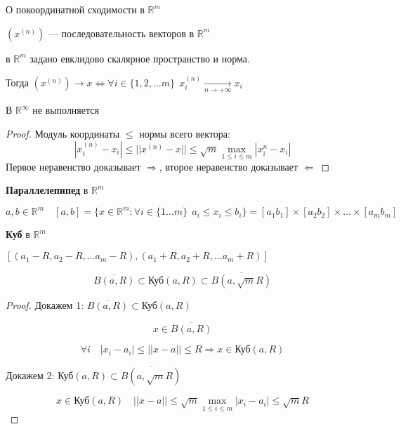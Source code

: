 \begin{lemma}
    О покоординатной сходимости в $\mathbb{R}^m$

    $(x^{(n)})$ --- последовательность векторов в $\mathbb{R}^m$
    
    в $\mathbb{R}^m$ задано евклидово скалярное пространство и норма.

    Тогда $(x^{(n)})\to x \Leftrightarrow \forall i\in\{1,2,\ldots m\} \ \ x_i^{(n)}\underset{n\to+\infty}\to x_i$
\end{lemma}

\begin{remark}
    В $\mathbb{R}^{\infty}$ не выполняется
\end{remark}

\begin{proof}
    Модуль координаты $\leq$ нормы всего вектора:
    $$|x_i^{(n)}-x_i|\leq ||x^{(n)}-x||\leq \sqrt{m}\max\limits_{1\leq i\leq m} |x_i^{n}-x_i|$$
    Первое неравенство доказывает $\Rightarrow$, второе неравенство доказывает $\Leftarrow$
\end{proof}

\begin{definition}
    \textbf{Параллелепипед} в $\mathbb{R}^m$

    $a,b\in\mathbb{R}^m \quad [a,b]=\{x \in\mathbb{R}^m : \forall i\in\{1\ldots m\} \ \ a_i\leq x_i\leq b_i \} = [a_1b_1]\times[a_2b_2]\times\ldots\times[a_mb_m]$
\end{definition}

\begin{definition}
    \textbf{Куб} в $\mathbb{R}^m$

    $[(a_1-R,a_2-R,\ldots a_m-R), (a_1+R,a_2+R,\ldots a_m+R)]$
\end{definition}

$$\overline{B(a,R)}\subset\text{Куб}(a,R)\subset \overline{B(a,\sqrt mR)}$$

\begin{proof}
    Докажем 1: $\overline{B(a,R)}\subset\text{Куб}(a,R)$

    $$x\in \overline{B(a,R)}$$

    $$\forall i \quad |x_i-a_i|\leq ||x-a||\leq R \Rightarrow x\in\text{Куб}(a,R)$$

    Докажем 2: $\text{Куб}(a,R)\subset \overline{B(a,\sqrt mR)}$

    $$x\in\text{Куб}(a,R)\quad ||x-a||\leq\sqrt m \max\limits_{1\leq i\leq m} |x_i-a_i|\leq \sqrt mR$$
\end{proof}

